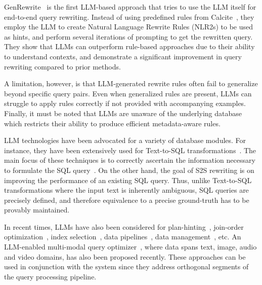 GenRewrite~\cite{Genrewrite} is the first LLM-based approach that tries to use the LLM itself for end-to-end query rewriting.
Instead of using predefined rules from Calcite~\cite{Calcite}, they employ the LLM to create Natural Language Rewrite Rules (NLR2s) to be used as hints, and perform several iterations of prompting to get the rewritten query. 
They show that LLMs can outperform rule-based approaches due to their ability to understand contexts, and demonstrate a significant improvement in query rewriting compared to prior methods. 

A limitation, however, is that LLM-generated rewrite rules often fail to generalize beyond specific query pairs. Even when generalized rules are present,  LLMs can struggle to apply rules correctly if not provided with accompanying examples. Finally, it must be noted that LLMs are unaware of the underlying database which restricts their ability to produce efficient metadata-aware rules. 

LLM technologies have been advocated for a variety of database modules. For instance, they have been extensively used for Text-to-SQL transformations~\cite{BIRD, DB-GPT, sqleval, sqlcoder,2024CHESSpaper,DBGPT}.
The main focus of these techniques is to correctly ascertain the information necessary to formulate the SQL query~\cite{MACSQL,DINSQL,2024CHESSpaper}.
On the other hand, the goal of S2S rewriting is on improving the performance of an existing SQL query.  Thus, unlike Text-to-SQL transformations where the input text is inherently ambiguous, SQL queries are precisely defined, and therefore
equivalence to a precise ground-truth has to be provably maintained. 

In recent times, LLMs have also been considered for plan-hinting~\cite{LLMplanhint}, join-order optimization~\cite{LLMjoinorder}, index selection~\cite{DBGPT}, data pipelines~\cite{LLM_as_interface_for_data_pipeline}, data management~\cite{LLM_for_Data_Management}, etc.  An LLM-enabled multi-modal query optimizer~\cite{multi_model_query_optimizer}, where data spans text, image, audio and video domains, has also been proposed recently. These approaches can be used in conjunction with the \lithe system since they address orthogonal segments of the query processing pipeline.
